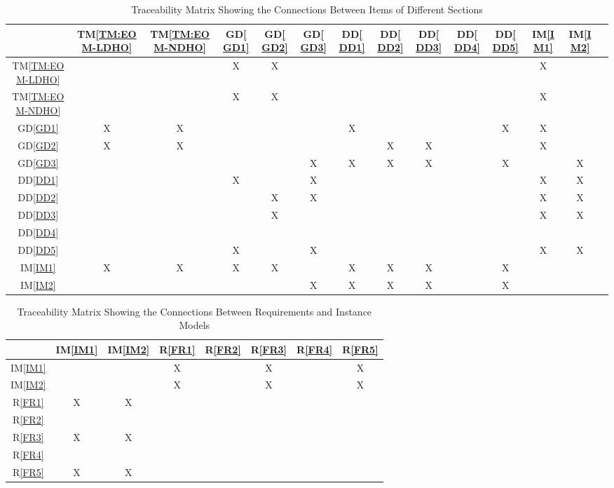 \documentclass[12pt]{article}
\newcommand{\dref}[1]{GD\ref{#1}}
\newcommand{\ddref}[1]{DD\ref{#1}}
\newcommand{\tref}[1]{TM\ref{#1}}
\newcommand{\iref}[1]{IM\ref{#1}}
\newcommand{\rref}[1]{R\ref{#1}}
\begin{document}
\begin{table}[h!]
\centering
\begin{tabular}{|c|c|c|c|c|c|c|c|c|c|c|c|c|c|}
\hline        
	& \tref{TM:EOM-LDHO}& \tref{TM:EOM-NDHO}& \dref{GD1}& \dref{GD2}& \dref{GD3} & \ddref{DD1}& \ddref{DD2} & \ddref{DD3}& \ddref{DD4}& \ddref{DD5}& \iref{IM1}& \iref{IM2} \\
\hline
\tref{TM:EOM-LDHO}     & & & X& X& & & & & & & X& \\ \hline
\tref{TM:EOM-NDHO}     & & & X& X& & & & & & & X& \\ \hline
\dref{GD1}        &X & X& & & & X& & & & X& X& \\ \hline
\dref{GD2}      & X& X& & & & & X& X& & & X& \\ \hline
\dref{GD3}      & & & & & X& X& X& X& & X& &X \\ \hline
\ddref{DD1} & & & X& & X& & & & & & X&X \\ \hline
\ddref{DD2}  & & & & X& X& & & & & & X&X \\ \hline
\ddref{DD3}    & & & & X& & & & & & & X&X \\ \hline
\ddref{DD4}     & & & & & & & & & & & & \\ \hline
\ddref{DD5}     & & & X& & X& & & & & & X&X \\ \hline
\iref{IM1}      & X& X& X& X& & X& X& X& & X& & \\ \hline
\iref{IM2}      & & & & & X& X& X& X& & X& & \\ \hline
\end{tabular}
\caption{Traceability Matrix Showing the Connections Between Items of Different Sections}
\label{Table:trace}
\end{table}

\begin{table}[h!]
\centering
\begin{tabular}{|c|c|c|c|c|c|c|c|}
\hline
	& \iref{IM1}& \iref{IM2}& \rref{FR1}& \rref{FR2}& \rref{FR3}& \rref{FR4}& \rref{FR5} \\
\hline
\iref{IM1}            & & & X& & X& & X \\ \hline
\iref{IM2}            & & & X& & X& & X \\ \hline
\rref{FR1}     & X& X& & & & & \\ \hline
\rref{FR2}    & & & & & & & \\ \hline
\rref{FR3}   & X& X& & & & & \\ \hline
\rref{FR4}    & & & & & & &  \\ \hline
\rref{FR5}     & X& X& & & & & \\ \hline 
\end{tabular}
\caption{Traceability Matrix Showing the Connections Between Requirements and Instance Models}
\label{Table:R_trace}
\end{table}
\end{document}
